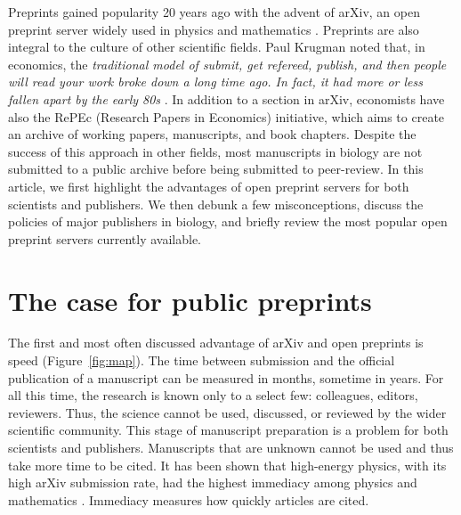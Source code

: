 \documentclass[letterpaper,twocolumn,superscriptaddress,showkeys,longbibliography]{revtex4-1}
\begin{document}
Preprints gained popularity 20 years ago with the advent of arXiv, an open
preprint server widely used in physics and mathematics \cite{gin11}. Preprints
are also integral to the culture of other scientific fields.  Paul Krugman noted
that, in economics, the \emph{traditional model of submit, get refereed,
publish, and then people will read your work broke down a long time ago. In
fact, it had more or less fallen apart by the early 80s} \cite{kru12}. In
addition to a section in arXiv, economists have also the RePEc (Research Papers
in Economics) initiative, which aims to create an archive of working papers,
manuscripts, and book chapters.  Despite the success of this approach in other
fields, most manuscripts in biology are not submitted to a public archive before
being submitted to peer-review. In this article, we first highlight the
advantages of open preprint servers for both scientists and publishers. We
then debunk a few misconceptions, discuss the policies of major publishers in
biology, and briefly review the most popular open preprint servers currently available.

\section{The case for public preprints}

The first and most often discussed advantage of arXiv and open preprints is
speed (Figure~\ref{fig:map}). The time between submission and the official
publication of a manuscript can be measured in months, sometime in years. For
all this time, the research is known only to a select few: colleagues, editors,
reviewers. Thus, the science cannot be used, discussed, or reviewed by the
wider scientific community. This stage of manuscript preparation is a problem
for both scientists and publishers. Manuscripts that are unknown cannot be used
and thus take more time to be cited. It has been shown that high-energy physics,
with its high arXiv submission rate, had the highest immediacy among physics and
mathematics \cite{pra05}. Immediacy measures how quickly articles are cited. 
\end{document}
